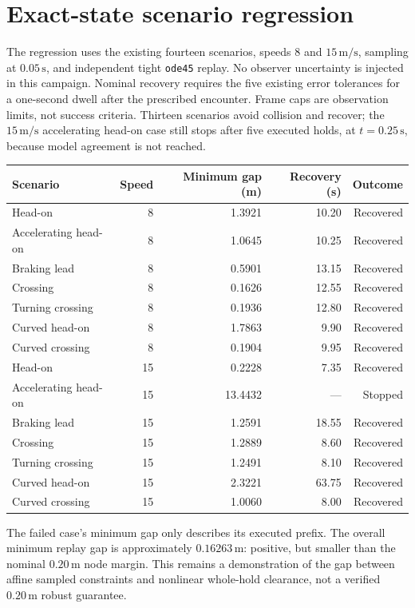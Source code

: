 \documentclass[11pt]{article}
\begin{document}
\section{Exact-state scenario regression}
The regression uses the existing fourteen scenarios, speeds $8$ and
$15\,\mathrm{m/s}$, sampling at $0.05\,\mathrm s$, and independent tight
\texttt{ode45} replay. No observer uncertainty is injected in this campaign.
Nominal recovery requires the five existing error tolerances for a one-second
dwell after the prescribed encounter. Frame caps are observation limits,
not success criteria. Thirteen scenarios avoid collision and recover; the
$15\,\mathrm{m/s}$ accelerating head-on case still stops after five executed
holds, at $t=0.25\,\mathrm s$, because model agreement is not reached.

\begin{center}
\begin{tabular}{lrrrr}
\toprule
Scenario & Speed & Minimum gap (m) & Recovery (s) & Outcome\\
\midrule
Head-on & 8 & 1.3921 & 10.20 & Recovered \\
Accelerating head-on & 8 & 1.0645 & 10.25 & Recovered \\
Braking lead & 8 & 0.5901 & 13.15 & Recovered \\
Crossing & 8 & 0.1626 & 12.55 & Recovered \\
Turning crossing & 8 & 0.1936 & 12.80 & Recovered \\
Curved head-on & 8 & 1.7863 & 9.90 & Recovered \\
Curved crossing & 8 & 0.1904 & 9.95 & Recovered \\
Head-on & 15 & 0.2228 & 7.35 & Recovered \\
Accelerating head-on & 15 & 13.4432 & --- & Stopped \\
Braking lead & 15 & 1.2591 & 18.55 & Recovered \\
Crossing & 15 & 1.2889 & 8.60 & Recovered \\
Turning crossing & 15 & 1.2491 & 8.10 & Recovered \\
Curved head-on & 15 & 2.3221 & 63.75 & Recovered \\
Curved crossing & 15 & 1.0060 & 8.00 & Recovered \\
\bottomrule
\end{tabular}
\end{center}
The failed case's minimum gap only describes its executed prefix. The
overall minimum replay gap is approximately $0.16263\,\mathrm m$: positive,
but smaller than the nominal $0.20\,\mathrm m$ node margin. This remains a
demonstration of the gap between affine sampled constraints and nonlinear
whole-hold clearance, not a verified $0.20\,\mathrm m$ robust guarantee.
\end{document}
